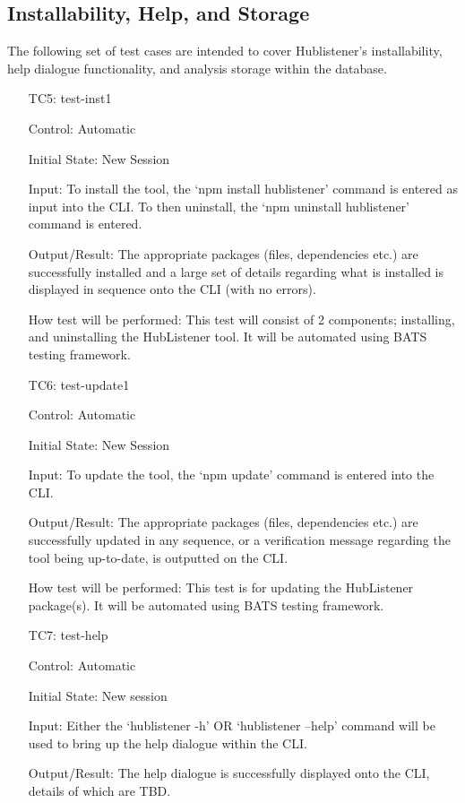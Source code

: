 \documentclass[12pt, titlepage]{article}
\begin{document}
\subsection{Installability, Help, and Storage}
The following set of test cases are intended to cover Hublistener's installability, help dialogue functionality, and analysis storage within the database.
\begin{enumerate}
\item[TC5:] test-inst1 

Control: Automatic
	
Initial State: New Session
			
Input: To install the tool, the `npm install hublistener' command is entered as input into the CLI. To then uninstall, the `npm uninstall hublistener' command is entered. 
					
Output/Result: The appropriate packages (files, dependencies etc.) are successfully installed and a large set of details regarding what is installed is displayed in sequence onto the CLI (with no errors).   
		
How test will be performed: This test will consist of 2 components; installing, and uninstalling the HubListener tool. It will be automated using BATS testing framework.

\item[TC6:] test-update1 

Control: Automatic
	
Initial State: New Session
			
Input: To update the tool, the `npm update' command is entered into the CLI.
					
Output/Result: The appropriate packages (files, dependencies etc.) are successfully updated in any sequence, or a verification message regarding the tool being up-to-date, is outputted on the CLI.  
		
How test will be performed: This test is for updating the HubListener package(s). It will be automated using BATS testing framework.

\item[TC7:] test-help

Control: Automatic
					
Initial State: New session
					
Input: Either the `hublistener -h' OR `hublistener --help' command will be used to bring up the help dialogue within the CLI. 
					
Output/Result: The help dialogue is successfully displayed onto the CLI, details of which are TBD. 
				

\end{enumerate}
\end{document}
